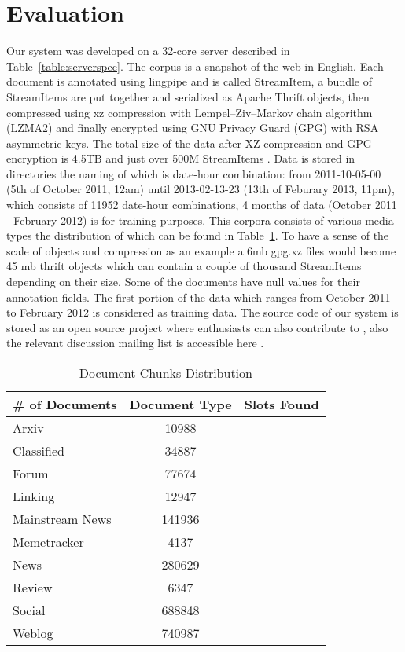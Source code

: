 
\section{Evaluation}
\label{sec:results}

 Our system was developed on a 32-core server described in Table~\ref{table:serverspec}. The corpus is a snapshot of the web in English. Each document is annotated using lingpipe and is called StreamItem, a bundle of StreamItems are put together and serialized as Apache Thrift objects, then compressed using xz compression with Lempel–Ziv–Markov chain algorithm (LZMA2) and finally encrypted using GNU Privacy Guard (GPG) with RSA asymmetric keys. The total size of the data after XZ compression and GPG encryption is 4.5TB and just over 500M StreamItems \cite{s3}. Data is stored in directories the naming of which is date-hour combination: from 2011-10-05-00 (5th of October 2011, 12am) until 2013-02-13-23 (13th of Feburary 2013, 11pm), which consists of 11952 date-hour combinations, 4 months of data (October 2011 - February 2012) is for training purposes. This corpora consists of various media types the distribution of which can be found in Table~\ref{table:documentsDist}. To have a sense of the scale of objects and compression as an example a 6mb gpg.xz files would become 45 mb thrift objects which can contain a couple of thousand StreamItems depending on their size. Some of the documents have null values for their annotation fields. The first portion of the data which ranges from October 2011 to February 2012 is considered as training data. The source code of our system is stored as an open source project where enthusiasts can also contribute to \cite{github}, also the relevant discussion mailing list is accessible here \cite{googlegroups}.
 
 
\begin{table}[b]
\caption{Document Chunks Distribution }
\centering
\label{table:documentsDist}

\begin{tabular}{|l|c|c|}
\hline 
\textbf{\# of Documents} & \textbf{Document Type} & \textbf{Slots Found}\\ 
\hline 
	Arxiv & 10988 & \\ \hline
 Classified & 34887 & \\ \hline
 Forum & 77674 & \\ \hline
 Linking & 12947 & \\ \hline
 Mainstream News & 141936 & \\ \hline
 Memetracker & 4137 & \\ \hline
 News & 280629 & \\ \hline
 Review & 6347 & \\ \hline
 	 Social & 688848 & \\ \hline
 Weblog & 740987 & \\ \hline

  
\hline 
\end{tabular} 
\end{table}


